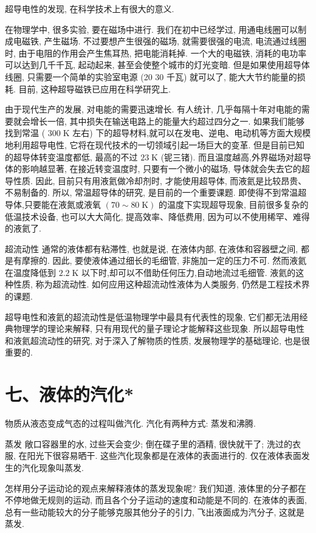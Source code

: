\documentclass[10pt]{article}
\begin{document}
超导电性的发现, 在科学技术上有很大的意义.

在物理学中, 很多实验, 要在磁场中进行. 我们在初中已经学过, 用通电线圈可以制成电磁铁, 产生磁场. 不过要想产生很强的磁场, 就需要很强的电流, 电流通过线圈时, 由于电阻的作用会产生焦耳热, 把电能消耗掉. 一个大的电磁铁, 消耗的电功率可以达到几千千瓦, 起动起来, 甚至会使整个城市的灯光变暗. 但是如果使用超导体线圈, 只需要一个简单的实验室电源 (20 30 千瓦) 就可以了, 能大大节约能量的损耗. 目前, 这种超导磁铁已应用在科学研究上.

由于现代生产的发展, 对电能的需要迅速增长. 有人统计, 几乎每隔十年对电能的需要就会增长一倍, 其中损失在输送电路上的能量大约超过四分之一. 如果我们能够找到常温 ( \({300}\mathrm{\;K}\) 左右) 下的超导材料,就可以在发电、逆电、电动机等方面大规模地利用超导电性, 它将在现代技术的一切领域引起一场巨大的变革. 但是目前已知的超导体转变温度都低, 最高的不过 \({23}\mathrm{\;K}\) (铌三锗). 而且温度越高,外界磁场对超导体的影响越显著, 在接近转变温度时, 只要有一个微小的磁场, 导体就会失去它的超导性质. 因此, 目前只有用液氦做冷却剂时, 才能使用超导体, 而液氦是比较昂贵、不易制备的. 所以, 常温超导体的研究, 是目前的一个重要课题. 即使得不到常温超导体,只要能在液氮或液氧 \(\left( {{70} \sim {80}\mathrm{\;K}}\right)\) 的温度下实现超导现象, 目前很多复杂的低温技术设备, 也可以大大简化, 提高效率、降低费用, 因为可以不使用稀罕、难得的液氦了.

超流动性 通常的液体都有粘滞性, 也就是说, 在液体内部, 在液体和容器壁之间, 都是有摩擦的. 因此, 要使液体通过细长的毛细管, 非施加一定的压力不可. 然而液氦在温度降低到 \({2.2}\mathrm{\;K}\) 以下时,却可以不借助任何压力,自动地流过毛细管. 液氦的这种性质, 称为超流动性. 如何应用这种超流动性液体为人类服务, 仍然是工程技术界的课题.

超导电性和液氦的超流动性是低温物理学中最具有代表性的现象, 它们都无法用经典物理学的理论来解释, 只有用现代的量子理论才能解释这些现象. 所以超导电性和液氦超流动性的研究, 对于深入了解物质的性质, 发展物理学的基础理论, 也是很重要的.

\section*{七、液体的汽化*}

物质从液态变成气态的过程叫做汽化. 汽化有两种方式: 蒸发和沸腾.

蒸发 敞口容器里的水, 过些天会变少; 倒在碟子里的酒精, 很快就干了; 洗过的衣服, 在阳光下很容易晒干. 这些汽化现象都是在液体的表面进行的. 仅在液体表面发生的汽化现象叫蒸发.

怎样用分子运动论的观点来解释液体的蒸发现象呢? 我们知道, 液体里的分子都在不停地做无规则的运动, 而且各个分子运动的速度和动能是不同的. 在液体的表面, 总有一些动能较大的分子能够克服其他分子的引力, 飞出液面成为汽分子, 这就是蒸发.
\end{document}
